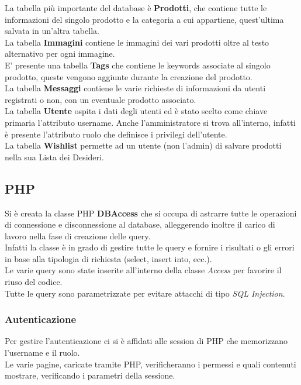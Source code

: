 \documentclass[a4paper, 11pt]{article}
\begin{document}
La tabella più importante del database è \textbf{Prodotti}, che contiene tutte le informazioni del singolo prodotto e la categoria a cui appartiene, quest’ultima salvata in un’altra tabella. \\
La tabella \textbf{Immagini} contiene le immagini dei vari prodotti oltre al testo alternativo per ogni immagine. \\
E’ presente una tabella \textbf{Tags} che contiene le keywords associate al singolo prodotto, queste vengono aggiunte durante la creazione del prodotto. \\
La tabella \textbf{Messaggi} contiene le varie richieste di informazioni da utenti registrati o non, con un eventuale prodotto associato.\\
La tabella \textbf{Utente} ospita i dati degli utenti ed è stato scelto come chiave primaria l’attributo username. 
Anche l’amministratore si trova all’interno, infatti è presente l’attributo ruolo che definisce i privilegi dell’utente. \\
La tabella \textbf{Wishlist} permette ad un utente (non l’admin) di salvare prodotti nella sua Lista dei Desideri.

\subsection{PHP}
Si è creata la classe PHP \textbf{DBAccess} che si occupa di astrarre tutte le operazioni di connessione e disconnessione al database, alleggerendo inoltre il carico di lavoro nella fase di creazione delle query.  \\
Infatti la classe è in grado di gestire tutte le query e fornire i risultati o gli errori in base alla tipologia di richiesta (select, insert into, ecc.). \\
Le varie query sono state inserite all’interno della classe \textit{Access} per favorire il riuso del codice.  \\
Tutte le query sono parametrizzate per evitare attacchi di tipo \textit{SQL Injection}.

\subsubsection{Autenticazione}
Per gestire l’autenticazione ci si è affidati alle session di PHP che memorizzano l’username e il ruolo. \\
Le varie pagine, caricate tramite PHP, verificheranno i permessi e quali contenuti mostrare, verificando i parametri della sessione. 
\end{document}
